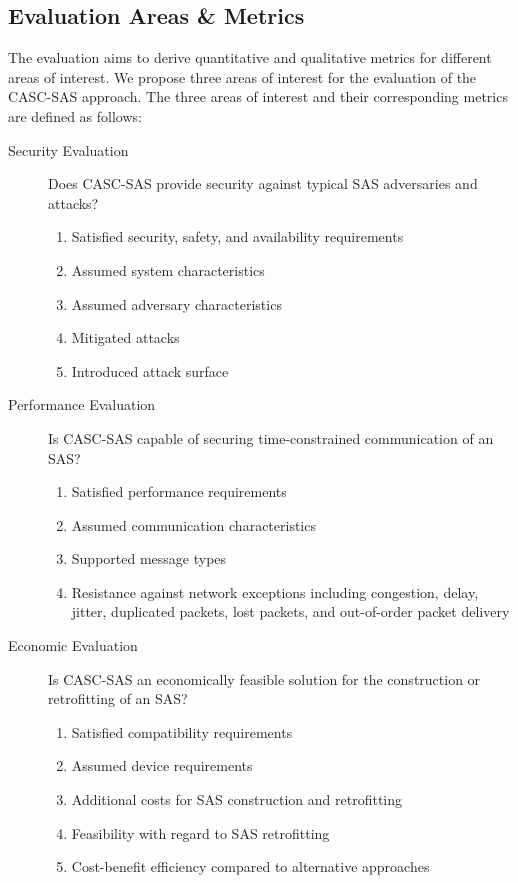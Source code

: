\subsection{Evaluation Areas \& Metrics}
The evaluation aims to derive quantitative and qualitative metrics for different areas of interest.
We propose three areas of interest for the evaluation of the CASC-SAS approach.
The three areas of interest and their corresponding metrics are defined as follows:
\begin{description}
    \item[Security Evaluation] Does CASC-SAS provide security against typical SAS adversaries and attacks?
    \begin{enumerate}
        \item Satisfied security, safety, and availability requirements
        \item Assumed system characteristics
        \item Assumed adversary characteristics
        \item Mitigated attacks
        \item Introduced attack surface
    \end{enumerate}
    \item[Performance Evaluation] Is CASC-SAS capable of securing time-constrained communication of an SAS?
    \begin{enumerate}
        \item Satisfied performance requirements
        \item Assumed communication characteristics
        \item Supported message types
        \item Resistance against network exceptions including congestion, delay, jitter, duplicated packets, lost packets, and out-of-order packet delivery
    \end{enumerate}
    \item[Economic Evaluation] Is CASC-SAS an economically feasible solution for the construction or retrofitting of an SAS?
    \begin{enumerate}
        \item Satisfied compatibility requirements
        \item Assumed device requirements
        \item Additional costs for SAS construction and retrofitting
        \item Feasibility with regard to SAS retrofitting
        \item Cost-benefit efficiency compared to alternative approaches
    \end{enumerate}
\end{description}


